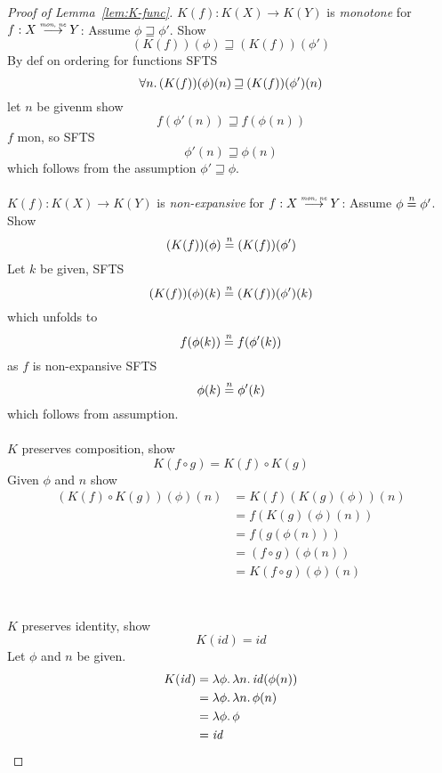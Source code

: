 \documentclass{article}
\newcommand{\monnefun}{\stackrel{\textit{\tiny{mon, ne}}}{\longrightarrow}}
\newcommand{\nequal}[1][n]{\stackrel{\tiny{#1}}{=}}
\newcommand{\id}{\var{id}}
\newcommand{\var}[1]{\mathit{#1}}
\newcommand{\future}{\mathbin{\sqsupseteq}}
\begin{document}
\begin{proof}[Proof of Lemma~\ref{lem:K-func}]
  $K(f) : K(X) \rightarrow K(Y)$ is \emph{monotone} for $f : X \monnefun Y$:
  Assume $\phi \future \phi'$. Show
  \[
    (K(f))(\phi) \future (K(f))(\phi') 
  \]
  By def on ordering for functions SFTS
  \[
    \forall n \ldotp (K(f))(\phi)(n) \future (K(f))(\phi')(n)
  \]
  let $n$ be givenm show
  \[
    f(\phi'(n)) \future f(\phi(n))
  \]
  $f$ mon, so SFTS
  \[
    \phi'(n) \future \phi(n)
  \]
  which follows from the assumption $\phi' \future \phi$.\\\\
  $K(f) : K(X) \rightarrow K(Y)$ is \emph{non-expansive} for $f : X \monnefun Y$:
  Assume $\phi \nequal \phi'$. Show
  \[
    (K(f))(\phi) \nequal (K(f))(\phi') 
  \]
  Let $k$ be given, SFTS
  \[
    (K(f))(\phi)(k) \nequal (K(f))(\phi')(k)
  \]
  which unfolds to
  \[
    f(\phi(k)) \nequal f(\phi'(k))
  \]
  as $f$ is non-expansive SFTS
  \[
    \phi(k) \nequal \phi'(k)
  \]
  which follows from assumption.\\\\
  $K$ preserves composition, show
  \[
    K(f \circ g) = K(f) \circ K(g)
  \]
  Given $\phi$ and $n$ show
  \begin{align*}
    (K(f) \circ K(g))(\phi)(n) & = K(f)(K(g)(\phi))(n) \\
                               & = f(K(g)(\phi)(n)) \\
                               & = f(g(\phi(n))) \\
                               & = (f \circ g)(\phi(n)) \\
                               & = K(f \circ g)(\phi)(n)
  \end{align*}\\\\
  $K$ preserves identity, show
  \[
    K(\id) = \id
  \]
  Let $\phi$ and $n$ be given.
  \begin{align*}
    K(\id) & = \lambda \phi \ldotp \lambda n \ldotp \id(\phi(n)) \\
           & = \lambda \phi \ldotp \lambda n \ldotp \phi(n) \\
           & = \lambda \phi \ldotp \phi \\
           & = \id
  \end{align*}
\end{proof}
\end{document}
